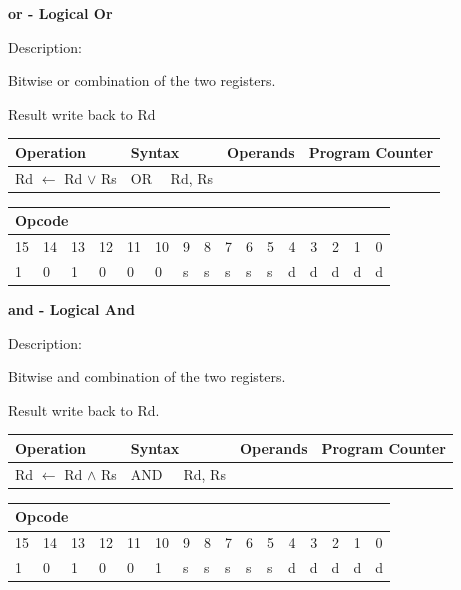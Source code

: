 \documentclass[%
	pdftex,
	a4paper,
	oneside,
	bibtotoc,%
	idxtotoc,%
	bibtotocnumbered,
	halfparskip,%
]{scrbook}
\begin{document}
\bigskip

\textbf{or - Logical Or}

Description:

Bitwise or combination of the two registers.

Result write back to Rd

\begin{tabular}{|l|l|l|l|}
\hline
Operation & Syntax & Operands & Program Counter \\ \hline
Rd $\leftarrow $ Rd $\vee $ Rs & OR \ \ Rd, Rs &  &  \\ \hline
\end{tabular}

\begin{tabular}{|c|c|c|c|c|c|c|c|c|c|c|c|c|c|c|c|}
\hline
\multicolumn{6}{|l|}{Opcode} & \multicolumn{5}{|l|}{} & \multicolumn{5}{|l|}{
} \\ \hline
15 & 14 & 13 & 12 & 11 & 10 & 9 & 8 & 7 & 6 & 5 & 4 & 3 & 2 & 1 & 0 \\ \hline
\multicolumn{1}{|l|}{1} & \multicolumn{1}{|l|}{0} & \multicolumn{1}{|l|}{1}
& \multicolumn{1}{|l|}{0} & \multicolumn{1}{|l|}{0} & \multicolumn{1}{|l|}{0}
& \multicolumn{1}{|l|}{s} & \multicolumn{1}{|l|}{s} & \multicolumn{1}{|l|}{s}
& \multicolumn{1}{|l|}{s} & \multicolumn{1}{|l|}{s} & \multicolumn{1}{|l|}{d}
& \multicolumn{1}{|l|}{d} & \multicolumn{1}{|l|}{d} & \multicolumn{1}{|l|}{d}
& \multicolumn{1}{|l|}{d} \\ \hline
\end{tabular}

\bigskip

\textbf{and - Logical And}

Description:

Bitwise and combination of the two registers.

Result write back to Rd.

\begin{tabular}{|l|l|l|l|}
\hline
Operation & Syntax & Operands & Program Counter \\ \hline
Rd $\leftarrow $ Rd $\wedge $ Rs & AND\ \ \ Rd, Rs &  &  \\ \hline
\end{tabular}

\begin{tabular}{|c|c|c|c|c|c|c|c|c|c|c|c|c|c|c|c|}
\hline
\multicolumn{6}{|l|}{Opcode} & \multicolumn{5}{|l|}{} & \multicolumn{5}{|l|}{
} \\ \hline
15 & 14 & 13 & 12 & 11 & 10 & 9 & 8 & 7 & 6 & 5 & 4 & 3 & 2 & 1 & 0 \\ \hline
\multicolumn{1}{|l|}{1} & \multicolumn{1}{|l|}{0} & \multicolumn{1}{|l|}{1}
& \multicolumn{1}{|l|}{0} & \multicolumn{1}{|l|}{0} & \multicolumn{1}{|l|}{1}
& \multicolumn{1}{|l|}{s} & \multicolumn{1}{|l|}{s} & \multicolumn{1}{|l|}{s}
& \multicolumn{1}{|l|}{s} & \multicolumn{1}{|l|}{s} & \multicolumn{1}{|l|}{d}
& \multicolumn{1}{|l|}{d} & \multicolumn{1}{|l|}{d} & \multicolumn{1}{|l|}{d}
& \multicolumn{1}{|l|}{d} \\ \hline
\end{tabular}
\end{document}
